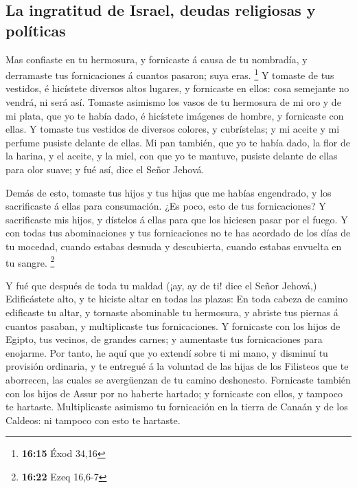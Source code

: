 \hypertarget{la-ingratitud-de-israel-deudas-religiosas-y-poluxedticas}{%
\subsection{La ingratitud de Israel, deudas religiosas y
políticas}\label{la-ingratitud-de-israel-deudas-religiosas-y-poluxedticas}}

 Mas confiaste en tu hermosura, y fornicaste á causa de tu
nombradía, y derramaste tus fornicaciones á cuantos pasaron; suya eras.
\footnote{\textbf{16:15} Éxod 34,16}  Y tomaste de tus
vestidos, é hicístete diversos altos lugares, y fornicaste en ellos:
cosa semejante no vendrá, ni será así.  Tomaste asimismo
los vasos de tu hermosura de mi oro y de mi plata, que yo te había dado,
é hicístete imágenes de hombre, y fornicaste con ellas.  Y
tomaste tus vestidos de diversos colores, y cubrístelas; y mi aceite y
mi perfume pusiste delante de ellas.  Mi pan también, que
yo te había dado, la flor de la harina, y el aceite, y la miel, con que
yo te mantuve, pusiste delante de ellas para olor suave; y fué así, dice
el Señor Jehová.

 Demás de esto, tomaste tus hijos y tus hijas que me habías
engendrado, y los sacrificaste á ellas para consumación. ¿Es poco, esto
de tus fornicaciones?  Y sacrificaste mis hijos, y dístelos
á ellas para que los hiciesen pasar por el fuego.  Y con
todas tus abominaciones y tus fornicaciones no te has acordado de los
días de tu mocedad, cuando estabas desnuda y descubierta, cuando estabas
envuelta en tu sangre. \footnote{\textbf{16:22} Ezeq 16,6-7}

 Y fué que después de toda tu maldad (¡ay, ay de ti! dice
el Señor Jehová,)  Edificástete alto, y te hiciste altar en
todas las plazas:  En toda cabeza de camino edificaste tu
altar, y tornaste abominable tu hermosura, y abriste tus piernas á
cuantos pasaban, y multiplicaste tus fornicaciones.  Y
fornicaste con los hijos de Egipto, tus vecinos, de grandes carnes; y
aumentaste tus fornicaciones para enojarme.  Por tanto, he
aquí que yo extendí sobre ti mi mano, y disminuí tu provisión ordinaria,
y te entregué á la voluntad de las hijas de los Filisteos que te
aborrecen, las cuales se avergüenzan de tu camino deshonesto.
 Fornicaste también con los hijos de Assur por no haberte
hartado; y fornicaste con ellos, y tampoco te hartaste. 
Multiplicaste asimismo tu fornicación en la tierra de Canaán y de los
Caldeos: ni tampoco con esto te hartaste.

